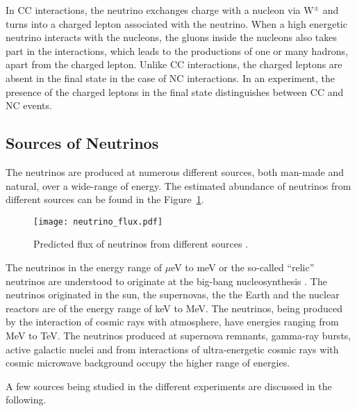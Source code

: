 In CC interactions, the neutrino exchanges charge with a nucleon via
$\mathrm{W}^{\pm}$ and turns into a charged lepton associated with the
neutrino. When a high energetic neutrino interacts with the nucleons,
the gluons inside the nucleons also takes part in the interactions,
which leads to the productions of one or many hadrons, apart from the
charged lepton. Unlike CC interactions, the charged leptons are absent
in the final state in the case of NC interactions. In an experiment,
the presence of the charged leptons in the final state distinguishes
between CC and NC events.

\subsection{Sources of Neutrinos}
The neutrinos are produced at numerous different sources, both
\mbox{man-made} and natural, over a wide-range of energy. The
estimated abundance of neutrinos from different sources can be found
in the Figure~\ref{fig:neutrino_flux}. 
\begin{figure}[h]
  \centering
  \texttt{[image: neutrino\_flux.pdf]}
  \caption{Predicted flux of neutrinos from different sources
    \cite{neutrinoflux}.}
  \label{fig:neutrino_flux}
\end{figure}

The neutrinos in the energy range of $\mu$eV to meV or the so-called
``relic'' neutrinos are understood to originate at the big-bang
nucleosynthesis \cite{nucleosynthesis}. The neutrinos originated in
the sun\cite{raydavis}, the supernovas, the
the Earth\cite{kamland,borexino} and the nuclear reactors are of the
energy range of keV to MeV. The neutrinos, being produced by the
interaction of cosmic rays with atmosphere, have energies ranging
from MeV to TeV. The neutrinos produced at supernova remnants,
gamma-ray bursts, active galactic nuclei and from interactions of
ultra-energetic cosmic rays with cosmic microwave background occupy
the higher range of energies.

A few sources being studied in the different experiments are discussed
in the following.

